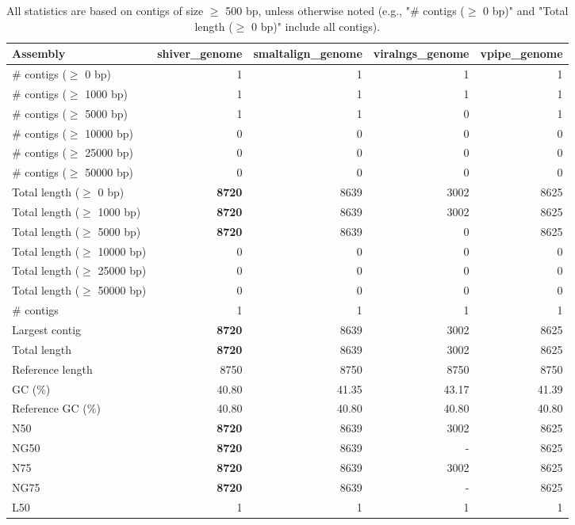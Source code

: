 \documentclass[12pt,a4paper]{article}
\begin{document}
\begin{table}[ht]
\begin{center}
\caption{All statistics are based on contigs of size $\geq$ 500 bp, unless otherwise noted (e.g., "\# contigs ($\geq$ 0 bp)" and "Total length ($\geq$ 0 bp)" include all contigs).}
\begin{tabular}{|l*{4}{|r}|}
\hline
Assembly & shiver\_genome & smaltalign\_genome & viralngs\_genome & vpipe\_genome \\ \hline
\# contigs ($\geq$ 0 bp) & 1 & 1 & 1 & 1 \\ \hline
\# contigs ($\geq$ 1000 bp) & 1 & 1 & 1 & 1 \\ \hline
\# contigs ($\geq$ 5000 bp) & 1 & 1 & 0 & 1 \\ \hline
\# contigs ($\geq$ 10000 bp) & 0 & 0 & 0 & 0 \\ \hline
\# contigs ($\geq$ 25000 bp) & 0 & 0 & 0 & 0 \\ \hline
\# contigs ($\geq$ 50000 bp) & 0 & 0 & 0 & 0 \\ \hline
Total length ($\geq$ 0 bp) & {\bf 8720} & 8639 & 3002 & 8625 \\ \hline
Total length ($\geq$ 1000 bp) & {\bf 8720} & 8639 & 3002 & 8625 \\ \hline
Total length ($\geq$ 5000 bp) & {\bf 8720} & 8639 & 0 & 8625 \\ \hline
Total length ($\geq$ 10000 bp) & 0 & 0 & 0 & 0 \\ \hline
Total length ($\geq$ 25000 bp) & 0 & 0 & 0 & 0 \\ \hline
Total length ($\geq$ 50000 bp) & 0 & 0 & 0 & 0 \\ \hline
\# contigs & 1 & 1 & 1 & 1 \\ \hline
Largest contig & {\bf 8720} & 8639 & 3002 & 8625 \\ \hline
Total length & {\bf 8720} & 8639 & 3002 & 8625 \\ \hline
Reference length & 8750 & 8750 & 8750 & 8750 \\ \hline
GC (\%) & 40.80 & 41.35 & 43.17 & 41.39 \\ \hline
Reference GC (\%) & 40.80 & 40.80 & 40.80 & 40.80 \\ \hline
N50 & {\bf 8720} & 8639 & 3002 & 8625 \\ \hline
NG50 & {\bf 8720} & 8639 & - & 8625 \\ \hline
N75 & {\bf 8720} & 8639 & 3002 & 8625 \\ \hline
NG75 & {\bf 8720} & 8639 & - & 8625 \\ \hline
L50 & 1 & 1 & 1 & 1 \\ \hline

\end{tabular}
\end{center}
\end{table}
\end{document}
